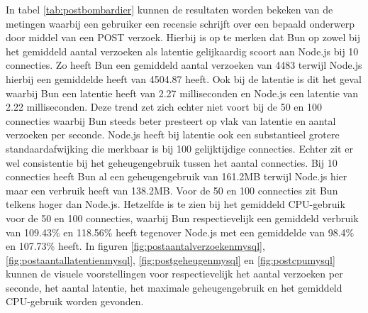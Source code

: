 In tabel \ref{tab:postbombardier} kunnen de resultaten worden bekeken van de metingen waarbij 
een gebruiker een recensie schrijft over een bepaald onderwerp door middel van een POST verzoek.
Hierbij is op te merken dat Bun op zowel bij het gemiddeld aantal verzoeken als latentie gelijkaardig scoort aan Node.js bij 10 connecties. Zo heeft Bun
een gemiddeld aantal verzoeken van 4483 terwijl Node.js hierbij een gemiddelde heeft van 4504.87 heeft. 
Ook bij de latentie is dit het geval waarbij Bun een latentie heeft van 2.27 milliseconden en Node.js een latentie van 2.22 milliseconden.
Deze trend zet zich echter niet voort bij de 50 en 100 connecties waarbij Bun steeds beter presteert op vlak van latentie en aantal verzoeken per seconde.
Node.js heeft bij latentie ook een substantieel grotere standaardafwijking die merkbaar is bij 100 gelijktijdige connecties.
Echter zit er wel consistentie bij het geheugengebruik tussen het aantal connecties.
Bij 10 connecties heeft Bun al een geheugengebruik van 161.2MB terwijl Node.js hier maar een verbruik heeft van 138.2MB.
Voor de 50 en 100 connecties zit Bun telkens hoger dan Node.js.
Hetzelfde is te zien bij het gemiddeld CPU-gebruik voor de 50 en 100 connecties, waarbij Bun respectievelijk
een gemiddeld verbruik van 109.43\% en 118.56\% heeft tegenover Node.js met een gemiddelde van 98.4\% en 107.73\% heeft.
In figuren \ref{fig:postaantalverzoekenmysql}, \ref{fig:postaantallatentienmysql}, \ref{fig:postgeheugenmysql} en \ref{fig:postcpumysql} kunnen de visuele voorstellingen 
voor respectievelijk het aantal verzoeken per seconde, het aantal latentie, het maximale geheugengebruik en het gemiddeld CPU-gebruik worden gevonden.
